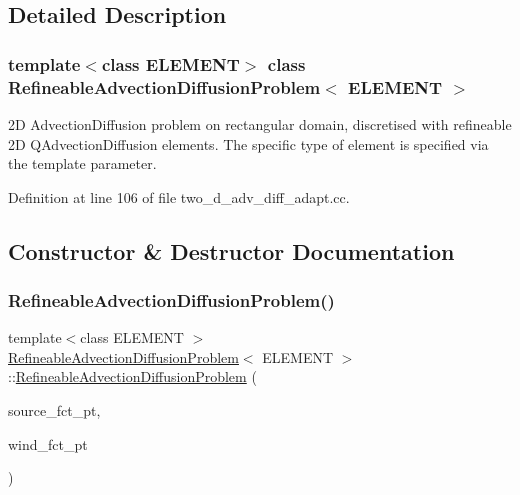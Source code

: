 \subsection{Detailed Description}
\subsubsection*{template$<$class E\+L\+E\+M\+E\+NT$>$\newline
class Refineable\+Advection\+Diffusion\+Problem$<$ E\+L\+E\+M\+E\+N\+T $>$}

2D Advection\+Diffusion problem on rectangular domain, discretised with refineable 2D Q\+Advection\+Diffusion elements. The specific type of element is specified via the template parameter. 

Definition at line 106 of file two\+\_\+d\+\_\+adv\+\_\+diff\+\_\+adapt.\+cc.



\subsection{Constructor \& Destructor Documentation}
\mbox{\label{classRefineableAdvectionDiffusionProblem_a515147bf0907ad339811955edb89817c}} 
\subsubsection{\texorpdfstring{Refineable\+Advection\+Diffusion\+Problem()}{RefineableAdvectionDiffusionProblem()}\hspace{0.1cm}{\footnotesize\ttfamily [1/2]}}
{\footnotesize\ttfamily template$<$class E\+L\+E\+M\+E\+NT $>$ \\
\hyperlink{classRefineableAdvectionDiffusionProblem}{Refineable\+Advection\+Diffusion\+Problem}$<$ E\+L\+E\+M\+E\+NT $>$\+::\hyperlink{classRefineableAdvectionDiffusionProblem}{Refineable\+Advection\+Diffusion\+Problem} (\begin{DoxyParamCaption}\item[{Advection\+Diffusion\+Equations$<$ 2 $>$\+::Advection\+Diffusion\+Source\+Fct\+Pt}]{source\+\_\+fct\+\_\+pt,  }\item[{Advection\+Diffusion\+Equations$<$ 2 $>$\+::Advection\+Diffusion\+Wind\+Fct\+Pt}]{wind\+\_\+fct\+\_\+pt }\end{DoxyParamCaption})}



